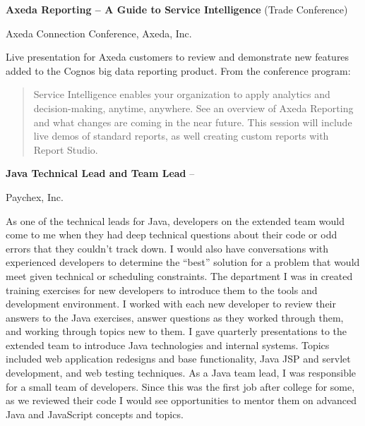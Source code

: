 \documentclass[letterpaper,MMMMyyyy,nonstopmode]{simpleresumecv}
\begin{document}
\begin{Body}
\BigGap
\Entry
\textbf{Axeda Reporting -- A Guide to Service Intelligence} (Trade Conference)
\hfill
{}

Axeda Connection Conference, Axeda, Inc.
\begin{Detail}
\Item
Live presentation for Axeda customers to review and demonstrate new features added to the Cognos big data reporting product.
\ifB
\Item
From the conference program:
\begin{quote}
Service Intelligence enables your organization to apply analytics and decision-making, anytime, anywhere. See an overview of Axeda Reporting and what changes are coming in the near future. This session will include live demos of standard reports, as well creating custom reports with Report Studio.
\end{quote}
\fi
\end{Detail}

\ifC      %
\BigGap
\Entry
\textbf{Java Technical Lead and Team Lead}
\hfill
{} -- 

Paychex, Inc.
\begin{Detail}
\BulletItem
As one of the technical leads for Java, developers on the extended team would come to me when they had deep technical questions about their code or odd errors that they couldn't track down. I would also have conversations with experienced developers to determine the ``best'' solution for a problem that would meet given technical or scheduling constraints.
\BulletItem
The department I was in created training exercises for new developers to introduce them to the tools and development environment. I worked with each new developer to review their answers to the Java exercises,  answer questions as they worked through them, and working through topics new to them.
\BulletItem
I gave quarterly presentations to the extended team to introduce Java technologies and internal systems. Topics included web application redesigns and base functionality, Java JSP and servlet development, and web testing techniques.
\BulletItem
As a Java team lead, I was responsible for a small team of developers. Since this was the first job after college for some, as we reviewed their code I would see opportunities to mentor them on advanced Java and JavaScript concepts and topics.
\end{Detail}
\fi      %

\fi %



\end{Body}
\end{document}
